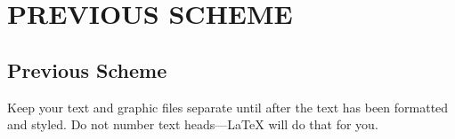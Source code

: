 \documentclass[conference]{IEEEtran}
\begin{document}


\section{PREVIOUS SCHEME}

\subsection{Previous Scheme}


Keep your text and graphic files separate until after the text has been 
formatted and styled. Do not number text heads---{\LaTeX} will do that 
for you.
\end{document}
